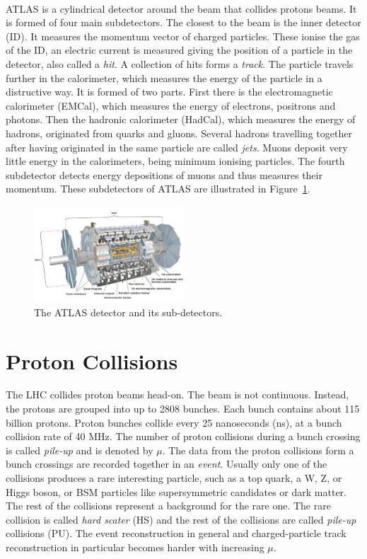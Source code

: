 \ \\ATLAS is a cylindrical detector around the beam that collides protons beams. It is formed of four main subdetectors. The closest to the beam is the inner detector (ID). It measures the momentum vector of charged particles. These ionise the gas of the ID, an electric current is measured giving the position of a particle in the detector, also called a \emph{hit}. A collection of hits forms a \emph{track}. The particle travels further in the calorimeter, which measures the energy of the particle in a distructive way. It is formed of two parts. First there is the electromagnetic calorimeter (EMCal), which measures the energy of electrons, positrons and photons. Then the hadronic calorimeter (HadCal), which measures the energy of hadrons, originated from quarks and gluons. Several hadrons travelling together after having originated in the same particle are called \emph{jets}. Muons deposit very little energy in the calorimeters, being minimum ionising particles. The fourth subdetector detects energy depositions of muons and thus measures their momentum. These subdetectors of ATLAS are illustrated in Figure~\ref{fig:ATLAS}.

\begin{figure}[!htb]
  \centering
  \includegraphics[width=0.5\textwidth]{plots/ATLAS.jpg} 
  \caption{The ATLAS detector and its sub-detectors.}
  \label{fig:ATLAS}
\end{figure}

\section{Proton Collisions}
\label{sec:ProtonCollisions}

The LHC collides proton beams head-on. The beam is not continuous. Instead, the protons are grouped into up to 2808 bunches. Each bunch contains about 115 billion protons. Proton bunches collide every 25 nanoseconds (ns), at a bunch collision rate of 40 MHz. The number of proton collisions during a bunch crossing is called \emph{pile-up} and is denoted by $\mu$. The data from the proton collisions form a bunch crossings are recorded together in an \emph{event}. Usually only one of the collisions produces a rare interesting particle, such as a top quark, a W, Z, or Higgs boson, or BSM particles like supersymmetric candidates or dark matter. The rest of the collisions represent a background for the rare one. The rare collision is called \emph{hard scater} (HS) and the rest of the collisions are called \emph{pile-up} collisions (PU). The event reconstruction in general and charged-particle track reconstruction in particular becomes harder with increasing $\mu$. 

